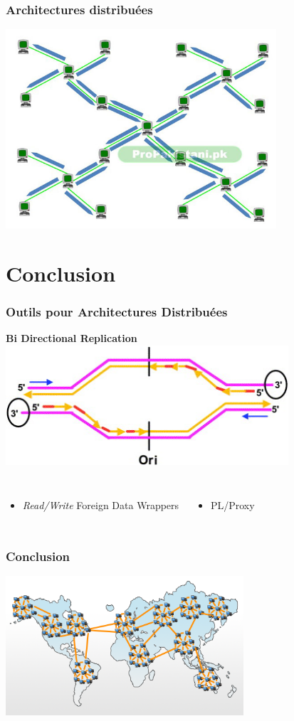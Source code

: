 \documentclass{beamer}
\begin{document}
\begin{frame}[fragile]
\begin{center}
  \frametitle{Architectures distribuées}

  \includegraphics[height=20em]{p2p.jpg}
\end{center}
\end{frame}

\section{Conclusion}

\begin{frame}[fragile]
  \frametitle{Outils pour Architectures Distribuées}

  \begin{center}
    \textbf{Bi Directional Replication}
    \vfill
    \includegraphics[height=12em]{bdr.jpg}
  \end{center}

\begin{columns}[c]
  \begin{itemize}
    \item \textit{Read/Write} Foreign Data Wrappers
  \end{itemize}
  \begin{itemize}
    \item PL/Proxy
  \end{itemize}
\end{columns}
\end{frame}

\begin{frame}[fragile]
  \frametitle{Conclusion}
  \begin{center}
    \includegraphics[height=14em]{p2p-world.png}
  \end{center}
\end{frame}
\end{document}
